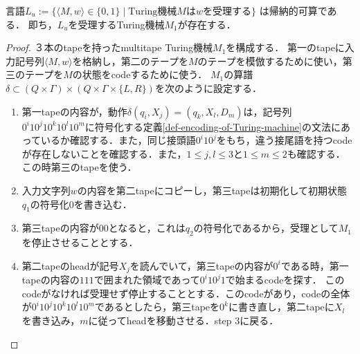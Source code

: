 \begin{theorem}[万能Turing機械の構成]\label{thm-existence-of-universal-Turing-machine}
    言語$L_u:=\{\langle M,w\rangle\in\{0,1\}\mid\mathrm{Turing}機械Mはwを受理する\}$
    は帰納的可算である．
    即ち，$L_u$を受理するTuring機械$M_1$が存在する．
\end{theorem}
\begin{proof}
    ３本のtapeを持ったmultitape Turing機械$M_1$を構成する．
    第一のtapeに入力記号列$\langle M,w\rangle$を格納し，第二のテープを$M$のテープを模倣するために使い，第三のテープを$M$の状態をcodeするために使う．
    $M_1$の算譜$\delta\subset (Q\times\Gamma)\times(Q\times\Gamma\times\{L,R\})$を次のように設定する．
    \begin{enumerate}
        \item 第一tapeの内容が，動作$\delta(q_i,X_j)=(q_k,X_l,D_m)$は，記号列$0^i10^j10^k10^l10^m$に符号化する定義\ref{def-encoding-of-Turing-machine}の文法にあっているか確認する．また，同じ接頭語$0^i10^j$をもち，違う接尾語を持つcodeが存在しないことを確認する．また，$1\le j,l\le 3$と$1\le m\le 2$も確認する．この時第三のtapeを使う．
        \item 入力文字列$w$の内容を第二tapeにコピーし，第三tapeは初期化して初期状態$q_1$の符号化$0$を書き込む．
        \item 第三tapeの内容が$00$となると，これは$q_2$の符号化であるから，受理として$M_1$を停止させることとする．
        \item 第二tapeのheadが記号$X_j$を読んでいて，第三tapeの内容が$0^i$である時，第一tapeの内容の$111$で囲まれた領域であって$0^i10^j1$で始まるcodeを探す．
        このcodeがなければ受理せず停止することとする．このcodeがあり，codeの全体が$0^i10^j10^k10^l10^m$であるとしたら，第三tapeを$0^k$に書き直し，第二tapeに$X_l$を書き込み，$m$に従ってheadを移動させる．step 3に戻る．
    \end{enumerate}
\end{proof}


